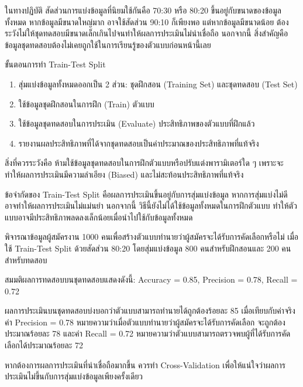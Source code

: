 ในทางปฏิบัติ สัดส่วนการแบ่งข้อมูลที่นิยมใช้กันคือ 70:30 หรือ 80:20 ขึ้นอยู่กับขนาดของข้อมูลทั้งหมด หากข้อมูลมีขนาดใหญ่มาก อาจใช้สัดส่วน 90:10 ก็เพียงพอ แต่หากข้อมูลมีขนาดน้อย ต้องระวังไม่ให้ชุดทดสอบมีขนาดเล็กเกินไปจนทำให้ผลการประเมินไม่น่าเชื่อถือ นอกจากนี้ สิ่งสำคัญคือข้อมูลชุดทดสอบต้องไม่เคยถูกใช้ในการเรียนรู้ของตัวแบบก่อนหน้านี้เลย

\begin{myBox}[]{ขั้นตอนการทำ Train-Test Split}{}
\begin{enumerate}
\item สุ่มแบ่งข้อมูลทั้งหมดออกเป็น 2 ส่วน: ชุดฝึกสอน (Training Set) และชุดทดสอบ (Test Set)
\item ใช้ข้อมูลชุดฝึกสอนในการฝึก (Train) ตัวแบบ
\item ใช้ข้อมูลชุดทดสอบในการประเมิน (Evaluate) ประสิทธิภาพของตัวแบบที่ฝึกแล้ว
\item รายงานผลประสิทธิภาพที่ได้จากชุดทดสอบเป็นค่าประมาณของประสิทธิภาพที่แท้จริง
\end{enumerate}

สิ่งที่ควรระวังคือ ห้ามใช้ข้อมูลชุดทดสอบในการฝึกตัวแบบหรือปรับแต่งพารามิเตอร์ใด ๆ เพราะจะทำให้ผลการประเมินมีความลำเอียง (Biased) และไม่สะท้อนประสิทธิภาพที่แท้จริง
\end{myBox}

ข้อจำกัดของ Train-Test Split คือผลการประเมินขึ้นอยู่กับการสุ่มแบ่งข้อมูล หากการสุ่มแบ่งไม่ดี อาจทำให้ผลการประเมินไม่แม่นยำ นอกจากนี้ วิธีนี้ยังไม่ได้ใช้ข้อมูลทั้งหมดในการฝึกตัวแบบ ทำให้ตัวแบบอาจมีประสิทธิภาพลดลงเล็กน้อยเมื่อนำไปใช้กับข้อมูลทั้งหมด

\begin{exmp}
\label{exmp:train_test_split}
พิจารณาข้อมูลผู้สมัครงาน 1000 คนเพื่อสร้างตัวแบบทำนายว่าผู้สมัครจะได้รับการคัดเลือกหรือไม่ เมื่อใช้ Train-Test Split ด้วยสัดส่วน 80:20 โดยสุ่มแบ่งข้อมูล 800 คนสำหรับฝึกสอนและ 200 คนสำหรับทดสอบ

สมมติผลการทดสอบบนชุดทดสอบแสดงดังนี้: Accuracy = 0.85, Precision = 0.78, Recall = 0.72

ผลการประเมินบนชุดทดสอบบ่งบอกว่าตัวแบบสามารถทำนายได้ถูกต้องร้อยละ 85 เมื่อเทียบกับค่าจริง ค่า Precision = 0.78 หมายความว่าเมื่อตัวแบบทำนายว่าผู้สมัครจะได้รับการคัดเลือก จะถูกต้องประมาณร้อยละ 78 และค่า Recall = 0.72 หมายความว่าตัวแบบสามารถตรวจพบผู้ที่ได้รับการคัดเลือกได้ประมาณร้อยละ 72

หากต้องการผลการประเมินที่น่าเชื่อถือมากขึ้น ควรทำ Cross-Validation เพื่อให้แน่ใจว่าผลการประเมินไม่ขึ้นกับการสุ่มแบ่งข้อมูลเพียงครั้งเดียว
\end{exmp}

